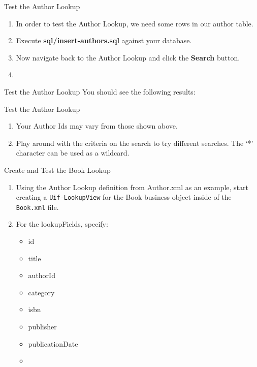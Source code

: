 \documentclass[xcolor=dvipsnames,14pt,professionalfonts]{beamer}
\begin{document}
  \begin{frame}{Test the Author Lookup}
    \begin{enumerate}
    \item In order to test the Author Lookup, we need some rows in our author table.
      \item Execute \textbf{sql/insert-authors.sql} against your database.
      \item Now navigate back to the Author Lookup and click the
        \textbf{Search} button.
      \item 
      \end{enumerate}
    \end{frame}
    
    \begin{frame}{Test the Author Lookup}
      You should see the following results:
    \end{frame}
    
    \begin{frame}{Test the Author Lookup}
      \begin{enumerate}
      \item Your Author Ids may vary from those shown above.
      \item Play around with the criteria on the search to try
        different searches.  The ‘*’ character can be used as a
        wildcard.
      \end{enumerate}
    \end{frame}

    \begin{frame}{Create and Test the Book Lookup}
      \begin{enumerate}
        \item Using the Author Lookup definition from Author.xml as an example, start creating a \texttt{Uif-LookupView} for the Book business object inside of the \texttt{Book.xml} file.
        \item For the lookupFields, specify:
          \begin{itemize}
            \item id
            \item title
            \item authorId
            \item category
            \item isbn
            \item publisher
            \item publicationDate
            \item 
            \end{itemize}
          \end{enumerate}
        \end{frame}
\end{document}
